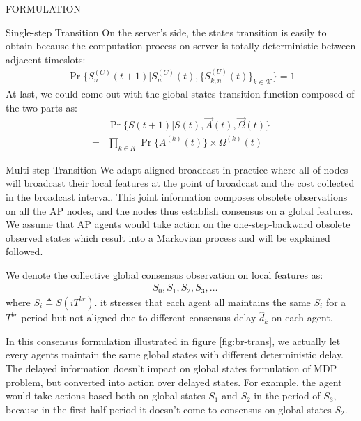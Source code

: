 \documentclass[10pt, conference, letterpaper]{IEEEtran}
\begin{document}
\begin{section}{FORMULATION}
\begin{subsection}{Single-step Transition}
            On the server's side, the states transition is easily to obtain because the computation process on server is totally deterministic between adjacent timeslots:
            \begin{align}
                \Pr\{ S_{n}^{(C)}(t+1) |S_{n}^{(C)}(t), \{S_{k,n}^{(U)}(t)\}_{k \in \mathcal{K}} \} = 1
            \end{align}
            At last, we could come out with the global states transition function composed of the two parts as:
            \begin{align}
                & \Pr\{ S(t+1)|S(t), \vec{A}(t), \vec{\Omega}(t)  \}
                \nonumber\\
                = & \prod_{k \in K} \Pr\{ A^{(k)}(t) \} \times \Omega^{(k)}(t)
            \end{align}
        \end{subsection}

        \begin{subsection}{Multi-step Transition}
            We adapt aligned broadcast in practice where all of nodes will broadcast their local features at the point of broadcast and the cost collected in the broadcast interval.
            This joint information composes obsolete observations on all the AP nodes, and the nodes thus establish consensus on a global features. We assume that AP agents would take action on the one-step-backward obsolete observed states which result into a Markovian process and will be explained followed.

            We denote the collective global consensus observation on local features as:
            \begin{align*}
                & S_0, S_1, S_2, S_3, \dots
            \end{align*}
            where $S_i \triangleq S(iT^{br})$. it stresses that each agent all maintains the same $S_i$ for a $T^{br}$ period but not aligned due to different consensus delay $\hat{d}_k$ on each agent.

            In this consensus formulation illustrated in figure \ref{fig:br-trans}, we actually let every agents maintain the same global states with different deterministic delay. The delayed information doesn't impact on global states formulation of MDP problem, but converted into action over delayed states. For example, the agent would take actions based both on global states $S_1$ and $S_2$ in the period of $S_3$, because in the first half period it doesn't come to consensus on global states $S_2$.


\end{subsection}
\end{section}
\end{document}
